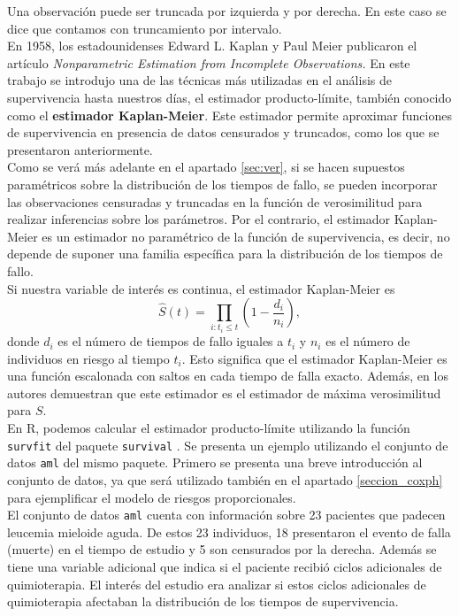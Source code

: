 \documentclass[11pt,a4paper]{article}
\begin{document}
Una observación puede ser truncada por izquierda y por derecha. En este caso se dice que contamos con truncamiento por intervalo.\\

En 1958, los estadounidenses Edward L. Kaplan y Paul Meier publicaron el artículo \textit{Nonparametric Estimation from Incomplete Observations.} En este trabajo se introdujo una de las técnicas más utilizadas en el análisis de supervivencia hasta nuestros días, el estimador producto-límite, también conocido como el \textbf{estimador Kaplan-Meier}. Este estimador permite aproximar funciones de supervivencia en presencia de datos censurados y truncados, como los que se presentaron anteriormente.\\

Como se verá más adelante en el apartado \ref{sec:ver}, si se hacen supuestos paramétricos sobre la distribución de los tiempos de fallo, se pueden incorporar las observaciones censuradas y truncadas en la función de verosimilitud para realizar inferencias sobre los parámetros. Por el contrario, el estimador Kaplan-Meier es un estimador no paramétrico de la función de supervivencia, es decir, no depende de suponer una familia específica para la distribución de los tiempos de fallo.\\

Si nuestra variable de interés es continua, el estimador Kaplan-Meier es
\begin{equation}
\label{eq:km}
\hat{S}(t) = \prod_{i: t_i \leq t} \left( 1-\frac{d_i}{n_i}\right),
\end{equation}
donde $d_i$ es el número de tiempos de fallo iguales a $t_i$ y $n_i$ es el número de individuos en riesgo al tiempo $t_i$. Esto significa que el estimador Kaplan-Meier es una función escalonada con saltos en cada tiempo de falla exacto. Además, en \cite{kaplan-meier} los autores demuestran que este estimador es el estimador de máxima verosimilitud para $S$.\\

En R, podemos calcular el estimador producto-límite utilizando la función \texttt{survfit} del paquete \texttt{survival} \citep{survival-book}. Se presenta un ejemplo utilizando el conjunto de datos \texttt{aml} del mismo paquete. Primero se presenta una breve introducción al conjunto de datos, ya que será utilizado también en el apartado  \ref{seccion_coxph} para ejemplificar el modelo de riesgos proporcionales.\\

El conjunto de datos \texttt{aml} cuenta con información sobre 23 pacientes que padecen leucemia mieloide aguda. De estos 23 individuos, 18 presentaron el evento de falla (muerte) en el tiempo de estudio y 5 son censurados por la derecha. Además se tiene una variable adicional que indica si el paciente recibió ciclos adicionales de quimioterapia. El interés del estudio era analizar si estos ciclos adicionales de quimioterapia afectaban la distribución de los tiempos de supervivencia.\\
\end{document}
